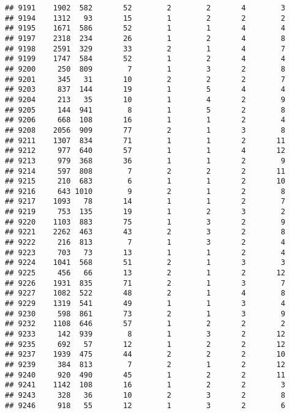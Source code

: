 \documentclass[]{article}
\begin{document}
\begin{verbatim}
## 9191    1902  582       52        2        2       4        3
## 9194    1312   93       15        1        2       2        2
## 9195    1671  586       52        1        1       4        4
## 9197    2318  234       26        1        2       4        8
## 9198    2591  329       33        2        1       4        7
## 9199    1747  584       52        1        2       4        4
## 9200     250  809        7        1        3       2        8
## 9201     345   31       10        2        2       2        7
## 9203     837  144       19        1        5       4        4
## 9204     213   35       10        1        4       2        9
## 9205     144  941        8        1        5       2        8
## 9206     668  108       16        1        1       2        4
## 9208    2056  909       77        2        1       3        8
## 9211    1307  834       71        1        1       2       11
## 9212     977  640       57        1        1       4       12
## 9213     979  368       36        1        1       2        9
## 9214     597  808        7        2        2       2       11
## 9215     210  683        6        1        1       2       10
## 9216     643 1010        9        2        1       2        8
## 9217    1093   78       14        1        1       2        7
## 9219     753  135       19        1        2       3        2
## 9220    1103  883       75        1        3       2        9
## 9221    2262  463       43        2        3       2        8
## 9222     216  813        7        1        3       2        4
## 9223     703   73       13        1        1       2        4
## 9224    1041  568       51        2        1       3        3
## 9225     456   66       13        2        1       2       12
## 9226    1931  835       71        2        1       3        7
## 9227    1082  522       48        2        1       4        8
## 9229    1319  541       49        1        1       3        4
## 9230     598  861       73        2        1       3        9
## 9232    1108  646       57        1        2       2        2
## 9233     142  939        8        1        3       2       12
## 9235     692   57       12        1        2       2       12
## 9237    1939  475       44        2        2       2       10
## 9239     384  813        7        2        1       2       12
## 9240     920  490       45        1        2       2       11
## 9241    1142  108       16        1        2       2        3
## 9243     328   36       10        2        3       2        8
## 9246     918   55       12        1        3       2        6

\end{verbatim}
\end{document}
